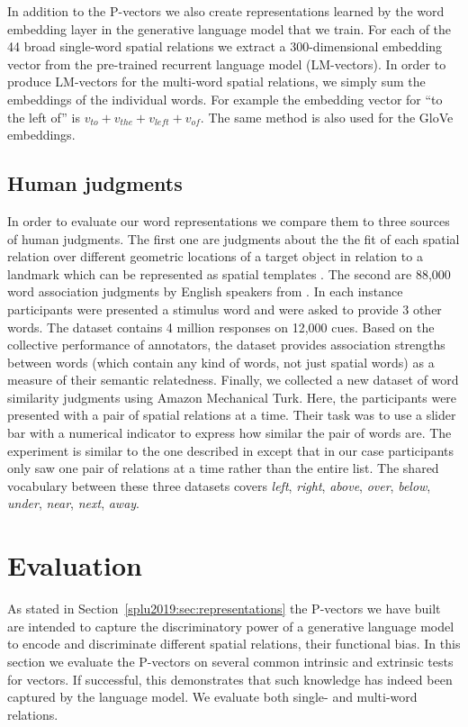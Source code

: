In addition to the P-vectors we also create representations learned by the word
embedding layer in the generative language model that we train.
For each of the 44 broad single-word spatial relations
we extract a 300-dimensional embedding vector from the pre-trained recurrent
language model (LM-vectors). In order to produce LM-vectors for the multi-word
spatial relations, we %
simply sum the
embeddings of the individual words. For example the embedding vector for ``to
the left of'' is $v_{to} + v_{the} + v_{left} + v_{of}$. The same method is
also used for the GloVe embeddings.


\subsection{Human judgments}\label{splu2019:sec:humanjudgments}
In order to evaluate our word representations we compare them to three sources
of human judgments. The first one are judgments about the the fit of each
spatial relation over different geometric locations of a target object in
relation to a landmark which can be represented as spatial templates
\cite{logan/sadler:1996}. The second are 88,000 word association judgments by English speakers from
\cite{de2018small}. %
In each instance participants were presented a
stimulus word and were asked to provide 3 other words. The dataset contains 4
million responses on 12,000 cues. Based on the collective performance of annotators, the
dataset provides association strengths between words (which contain any kind of
words, not just spatial words) as a measure of their semantic relatedness.
Finally, we collected a new dataset of word similarity judgments using Amazon
Mechanical Turk. Here, the participants were presented with a pair of spatial
relations at a time. Their task was to use a slider bar with a numerical
indicator to express how similar the pair of words are. The experiment is
similar to the one described in \cite{logan/sadler:1996} except that in our
case participants only saw one pair of relations at a time rather than the entire list. The
shared vocabulary between these three datasets covers \emph{left},
\emph{right}, \emph{above}, \emph{over}, \emph{below}, \emph{under},
\emph{near}, \emph{next}, \emph{away}.

\section{Evaluation}\label{splu2019:sec:experiments}


As stated in Section~\ref{splu2019:sec:representations} the P-vectors we have built are
intended to capture the discriminatory power of a generative language model to
encode and discriminate different spatial relations, their functional bias. In
this section we evaluate the P-vectors on several common intrinsic and
extrinsic tests for vectors. If successful, this demonstrates that such
knowledge has indeed been captured by the language model. We evaluate both
single- and multi-word relations.


